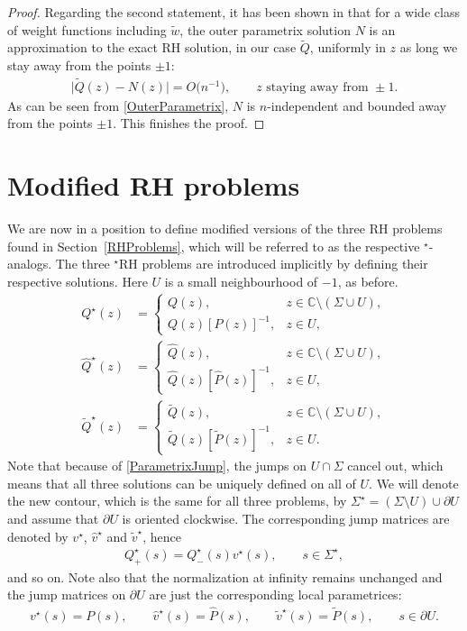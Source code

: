 \documentclass[11pt]{article}
\numberwithin{equation}{section}
\newcommand{\tw}{\widetilde w}
\newcommand{\bQ}{ Q}
\newcommand{\hQ}{{\widehat Q}}
\newcommand{\tQ}{{\widetilde Q}}
\newcommand{\sbQ}{Q^\star}
\newcommand{\shQ}{{\widehat Q^\star}}
\newcommand{\stQ}{{\widetilde Q^\star}}
\newcommand{\bP}{P}
\newcommand{\hP}{{\widehat P}}
\newcommand{\tP}{{\widetilde P}}
\newcommand{\sbv}{v^\star}
\newcommand{\shv}{{\widehat v^\star}}
\newcommand{\stv}{{\widetilde v^\star}}
\numberwithin{equation}{section}
\begin{document}
\begin{proof}
Regarding the second statement, it has been shown in \cite[Section~7]{KMVV} that for a wide class of weight functions including $\tw$, the outer parametrix solution $N$ is an approximation to the exact RH solution, in our case $\tQ$, uniformly in $z$ as long we stay away from the points $\pm 1$:
\begin{align*}
 \big|\tQ(z)-N(z)\big| = O\big(n^{-1}\big), \qquad z \mbox{ staying away from } \pm 1.
\end{align*}
As can be seen from \eqref{OuterParametrix}, $N$ is $n$-independent and bounded away from the points $\pm 1$. This finishes the proof.
\end{proof}

\section{Modified RH problems}\label{ModifiedRHP}
We are now in a position to define modified versions of the three RH problems found in Section~\ref{RHProblems}, which will be referred to as the respective ${}^\star$-analogs. The three ${}^\star$RH problems are introduced implicitly by defining their respective solutions. Here $U$ is a small neighbourhood of $-1$, as before.
\begin{align*}
 \sbQ(z) &= \begin{cases}
 \bQ(z), & z \in \mathbb{C} \setminus (\Sigma \cup U),
 \\
 \bQ(z) [\bP(z)]^{-1}, & z \in U,
 \end{cases}
 \\
 \shQ(z) &= \begin{cases}
 \hQ(z), & z \in \mathbb{C} \setminus (\Sigma \cup U),
 \\
 \hQ(z) [\hP(z)]^{-1}, & z \in U,
 \end{cases}
 \\
 \stQ(z) &=
 \begin{cases}
 \tQ(z), & z \in \mathbb{C} \setminus (\Sigma \cup U),
 \\
 \tQ(z) [\tP(z)]^{-1}, & z \in U.
 \end{cases}
\end{align*}
Note that because of \eqref{ParametrixJump}, the jumps on $U \cap \Sigma$ cancel out, which means that all three solutions can be uniquely defined on all of $U$. We will denote the new contour, which is the same for all three problems, by $\Sigma^\star = (\Sigma \setminus U) \cup \partial U$ and assume that $\partial U$ is oriented clockwise. The corresponding jump matrices are denoted by $\sbv$, $\shv$ and $\stv$, hence
\begin{align*}
 \sbQ_+(s) = \sbQ_-(s)\sbv(s), \qquad s\in \Sigma^\star,
\end{align*}
and so on. Note also that the normalization at infinity remains unchanged and the jump matrices on $\partial U$ are just the corresponding local parametrices:
\begin{align*}
 \sbv(s) = \bP(s), \qquad \shv(s) = \hP(s), \qquad \stv(s) = \tP(s), \qquad s \in \partial U.
\end{align*}
\end{document}

